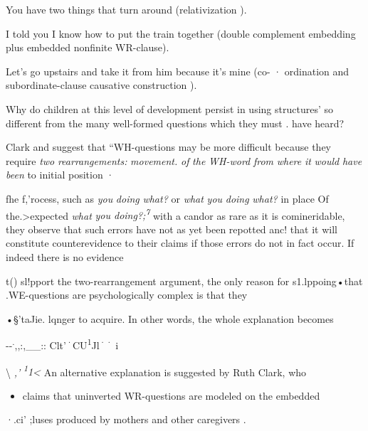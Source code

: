 \ea\label{ex:55}
 You have two things that turn around (relativization ).
\glt
\z

\ea\label{ex:56}
 I told you I know how to put the train together (double comple\-ment embedding plus embedded nonfinite WR-clause).
\glt
\z

\ea\label{ex:57}
 Let's go upstairs and take it from him because it's mine (co- · ordination and subordinate-clause causative construction ).
\glt
\z

Why do children at this level of development persist in using structures' so different from the many well-formed questions which they must . have heard?

Clark and \citet[354]{Clark1977} suggest that ``WH-questions may be more difficult because they require \textit{two} \textit{rearrangements:} \textit{movement.} \textit{of} \textit{the} \textit{WH-word} \textit{from} \textit{where} \textit{it} \textit{would} \textit{have} \textit{been} to initial position ·

fhe f,'rocess, such as \textit{you} \textit{doing} \textit{what?} or \textit{what} \textit{you} \textit{doi}\textit{n}\textit{g} \textit{what?} in place Of the.{\textgreater}expected \textit{what} \textit{you doing?;}\textit{\textsuperscript{7 }}with a candor as rare as it is comineridable, they observe that such errors have not as yet been repotted anc! that it will constitute counterevidence to their claims if those errors do not in fact occur. If indeed there is no evidence

t() sl!pport the two-rearrangement argument, the only reason for s1.lppoing•that .WE-questions are psychologically complex is that they 

•§'taJie. lqnger to acquire. In other words, the whole explanation becomes

{}-{}-\textsuperscript{.},,:,\_\_:: \textsuperscript{{\textquotedbl}}C\textsuperscript{{\textquotedbl}}lt'\textsuperscript{·}CU\textsuperscript{1}Jl\textsuperscript{·}\textsuperscript{·} i

{\textbackslash} \textit{,'} \textit{\textsuperscript{1}}\textit{1{\textless}} An alternative explanation is suggested by Ruth Clark, who

\begin{itemize}
\item claims that uninverted WR-questions are modeled on the embedded
\end{itemize}

·.ci' ;luses produced by mothers and other caregivers \citep{Clark1977}.

